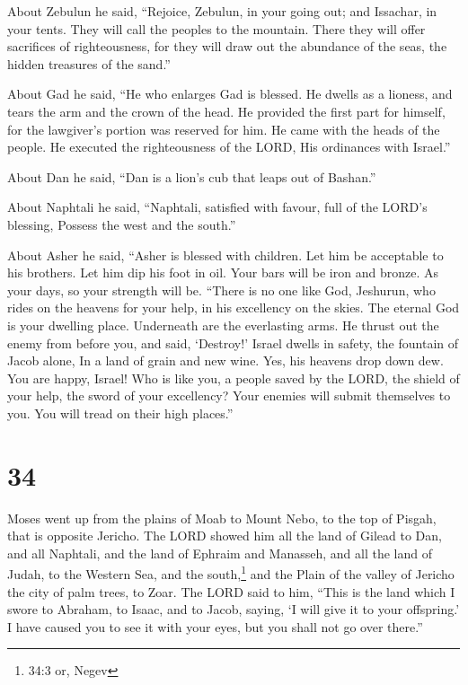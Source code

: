  About Zebulun he said, ``Rejoice, Zebulun, in your going
out; and Issachar, in your tents.  They will call the
peoples to the mountain. There they will offer sacrifices of
righteousness, for they will draw out the abundance of the seas, the
hidden treasures of the sand.''

 About Gad he said, ``He who enlarges Gad is blessed. He
dwells as a lioness, and tears the arm and the crown of the head.
 He provided the first part for himself, for the lawgiver's
portion was reserved for him. He came with the heads of the people. He
executed the righteousness of the LORD, His ordinances with Israel.''

 About Dan he said, ``Dan is a lion's cub that leaps out of
Bashan.''

 About Naphtali he said, ``Naphtali, satisfied with favour,
full of the LORD's blessing, Possess the west and the south.''

 About Asher he said, ``Asher is blessed with children. Let
him be acceptable to his brothers. Let him dip his foot in oil.
 Your bars will be iron and bronze. As your days, so your
strength will be.  ``There is no one like God, Jeshurun,
who rides on the heavens for your help, in his excellency on the skies.
 The eternal God is your dwelling place. Underneath are the
everlasting arms. He thrust out the enemy from before you, and said,
`Destroy!'  Israel dwells in safety, the fountain of Jacob
alone, In a land of grain and new wine. Yes, his heavens drop down dew.
 You are happy, Israel! Who is like you, a people saved by
the LORD, the shield of your help, the sword of your excellency? Your
enemies will submit themselves to you. You will tread on their high
places.''

\hypertarget{section-33}{%
\section{34}\label{section-33}}

 Moses went up from the plains of Moab to Mount Nebo, to the
top of Pisgah, that is opposite Jericho. The LORD showed him all the
land of Gilead to Dan,  and all Naphtali, and the land of
Ephraim and Manasseh, and all the land of Judah, to the Western Sea,
 and the south,\footnote{34:3 or, Negev} and the Plain of
the valley of Jericho the city of palm trees, to Zoar.  The
LORD said to him, ``This is the land which I swore to Abraham, to Isaac,
and to Jacob, saying, `I will give it to your offspring.' I have caused
you to see it with your eyes, but you shall not go over there.''

